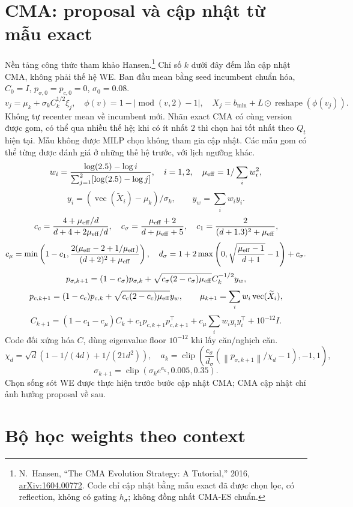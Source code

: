 \documentclass[11pt,a4paper]{article}
\newcommand{\norm}[1]{\left\lVert#1\right\rVert}
\newcommand{\clip}{\operatorname{clip}}
\newcommand{\vct}{\operatorname{vec}}
\begin{document}
\section{CMA: proposal và cập nhật từ mẫu exact}
Nền tảng công thức tham khảo Hansen.\footnote{N.~Hansen, ``The CMA Evolution Strategy: A Tutorial,'' 2016, \href{https://arxiv.org/abs/1604.00772}{arXiv:1604.00772}. Code chỉ cập nhật bằng mẫu exact đã được chọn lọc, có reflection, không có gating $h_\sigma$; không đồng nhất CMA-ES chuẩn.}
Chỉ số $k$ dưới đây đếm lần cập nhật CMA, không phải thế hệ WE. Ban đầu mean bằng seed incumbent chuẩn hóa, $C_0=I$, $p_{\sigma,0}=p_{c,0}=0$, $\sigma_0=0.08$.
\[
v_j=\mu_k+\sigma_k C_k^{1/2}\xi_j,\quad
\phi(v)=1-|\operatorname{mod}(v,2)-1|,\quad
X_j=b_{\min}+L\odot\operatorname{reshape}(\phi(v_j)).
\]
Không tự recenter mean về incumbent mới. Nhãn exact CMA có cùng version được gom, có thể qua nhiều thế hệ; khi có ít nhất $2$ thì chọn hai tốt nhất theo $Q_t$ hiện tại.
Mẫu không được MILP chọn không tham gia cập nhật. Các mẫu gom có thể từng được đánh giá ở những thế hệ trước, với lịch ngưỡng khác.
\[
w_i=\frac{\log(2.5)-\log i}{\sum_{j=1}^2[\log(2.5)-\log j]},\quad i=1,2,
\quad\mu_{\rm eff}=1/\sum_iw_i^2,
\]
\[
y_i=(\vct(\widetilde X_i)-\mu_k)/\sigma_k,\qquad y_w=\sum_iw_iy_i.
\]
\[
c_c=\frac{4+\mu_{\rm eff}/d}{d+4+2\mu_{\rm eff}/d},\quad
c_\sigma=\frac{\mu_{\rm eff}+2}{d+\mu_{\rm eff}+5},\quad
c_1=\frac2{(d+1.3)^2+\mu_{\rm eff}},
\]
\[
c_\mu=\min\left(1-c_1,\frac{2(\mu_{\rm eff}-2+1/\mu_{\rm eff})}{(d+2)^2+\mu_{\rm eff}}\right),
\quad d_\sigma=1+2\max\left(0,\sqrt{\frac{\mu_{\rm eff}-1}{d+1}}-1\right)+c_\sigma.
\]
\[
p_{\sigma,k+1}=(1-c_\sigma)p_{\sigma,k}
+\sqrt{c_\sigma(2-c_\sigma)\mu_{\rm eff}}C_k^{-1/2}y_w,
\]
\[
p_{c,k+1}=(1-c_c)p_{c,k}+\sqrt{c_c(2-c_c)\mu_{\rm eff}}y_w,
\qquad\mu_{k+1}=\sum_iw_i\vct(\widetilde X_i),
\]
\[
C_{k+1}=(1-c_1-c_\mu)C_k+c_1p_{c,k+1}p_{c,k+1}^\top
+c_\mu\sum_iw_iy_iy_i^\top+10^{-12}I.
\]
Code đối xứng hóa $C$, dùng eigenvalue floor $10^{-12}$ khi lấy căn/nghịch căn.
\[
\chi_d=\sqrt d(1-1/(4d)+1/(21d^2)),\quad
a_k=\clip\left(\frac{c_\sigma}{d_\sigma}(\norm{p_{\sigma,k+1}}/\chi_d-1),-1,1\right),
\]
\[
\sigma_{k+1}=\clip(\sigma_ke^{a_k},0.005,0.35).
\]
Chọn sống sót WE được thực hiện trước bước cập nhật CMA; CMA cập nhật chỉ ảnh hưởng proposal về sau.

\section{Bộ học weights theo context}
\end{document}
